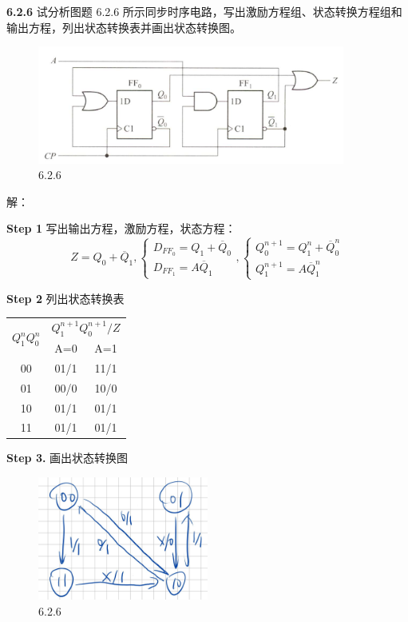 \documentclass[a4paper,11pt,UTF8]{article}
\begin{document}
\textbf{6.2.6} 试分析图题 6.2.6 所示同步时序电路，写出激励方程组、状态转换方程组和输出方程，列出状态转换表并画出状态转换图。
\begin{figure}[H]
	\centering
	\includegraphics[width=0.9\textwidth]{6.2.6}
	\caption{6.2.6}
\end{figure}
\noindent 解：

\textbf{Step 1} 写出输出方程，激励方程，状态方程：
$$
Z=Q_0+\overline{Q}_1,
\begin{cases}
	D_{FF_0}=Q_1+\overline{Q}_0\\
	D_{FF_1}=A\overline{Q}_1
\end{cases},
\begin{cases}
	Q_{0}^{n+1}=Q_1^{n}+\overline{Q}_0^n\\
	Q_{1}^{n+1}=A\overline{Q}_1^{n}
\end{cases}
$$

\textbf{Step 2} 列出状态转换表
\begin{table}[H]
	\centering
	\begin{tabular}{|c|c|c|}
		\hline
		\multirow{2}{*}{$Q_1^nQ_0^n$} & \multicolumn{2}{c|}{$Q_1^{n+1}Q_0^{n+1}/Z$}\\
		\cline{2-3}
		& A=0 & A=1\\
		\hline
		00 & 01/1 & 11/1\\
		01 & 00/0 & 10/0\\
		10 & 01/1 & 01/1\\
		11 & 01/1 & 01/1\\
		\hline
	\end{tabular}
\end{table}
\textbf{Step 3.} 画出状态转换图
\begin{figure}[H]
	\centering
	\includegraphics[width=0.5\textwidth]{6.2.6_1}
	\caption{6.2.6}
\end{figure}
\end{document}
